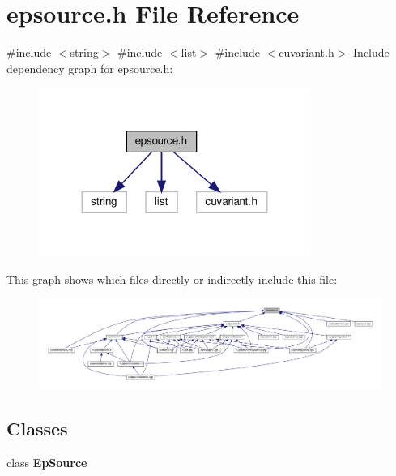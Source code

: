 \section{epsource.\+h File Reference}
\label{epsource_8h}
{\ttfamily \#include $<$string$>$}\newline
{\ttfamily \#include $<$list$>$}\newline
{\ttfamily \#include $<$cuvariant.\+h$>$}\newline
Include dependency graph for epsource.\+h\+:\nopagebreak
\begin{figure}[H]
\begin{center}
\leavevmode
\includegraphics[width=251pt]{epsource_8h__incl}
\end{center}
\end{figure}
This graph shows which files directly or indirectly include this file\+:\nopagebreak
\begin{figure}[H]
\begin{center}
\leavevmode
\includegraphics[width=350pt]{epsource_8h__dep__incl}
\end{center}
\end{figure}
\subsection*{Classes}
\begin{DoxyCompactItemize}
\item 
class \textbf{ Ep\+Source}
\end{DoxyCompactItemize}
